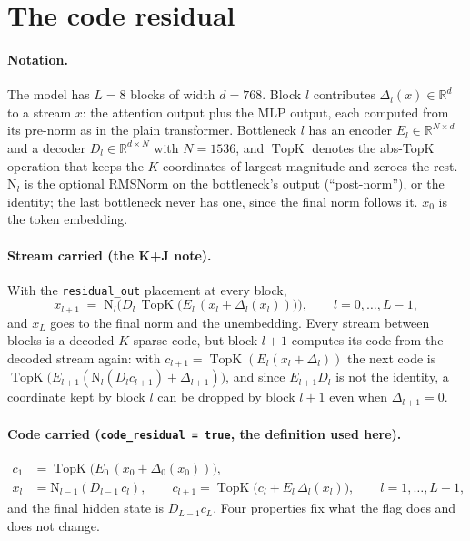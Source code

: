 \documentclass[11pt,a4paper]{article}
\newcommand{\code}[1]{\texttt{#1}}
\newcommand{\TopK}{\operatorname{TopK}}
\begin{document}
\section{The code residual}

\paragraph{Notation.}
The model has $L = 8$ blocks of width $d = 768$. Block $l$ contributes
$\Delta_l(x) \in \mathbb{R}^d$ to a stream $x$: the attention output plus the
MLP output, each computed from its pre-norm as in the plain transformer.
Bottleneck $l$ has an encoder $E_l \in \mathbb{R}^{N \times d}$ and a decoder
$D_l \in \mathbb{R}^{d \times N}$ with $N = 1536$, and $\TopK$ denotes the
abs-TopK operation that keeps the $K$ coordinates of largest magnitude and
zeroes the rest. $\mathrm{N}_l$ is the optional RMSNorm on the bottleneck's
output (``post-norm''), or the identity; the last bottleneck never has one,
since the final norm follows it. $x_0$ is the token embedding.

\paragraph{Stream carried (the K+J note).}
With the \code{residual\_out} placement at every block,
\begin{equation}
x_{l+1} \;=\; \mathrm{N}_l\!\Big(D_l \,\TopK\big(E_l\,(x_l + \Delta_l(x_l))\big)\Big),
\qquad l = 0, \dots, L-1,
\label{eq:stream}
\end{equation}
and $x_L$ goes to the final norm and the unembedding. Every stream between
blocks is a decoded $K$-sparse code, but block $l+1$ computes its code from
the decoded stream again: with $c_{l+1} = \TopK(E_l(x_l + \Delta_l))$ the
next code is $\TopK\big(E_{l+1}(\mathrm{N}_l(D_l c_{l+1}) + \Delta_{l+1})\big)$,
and since $E_{l+1} D_l$ is not the identity, a coordinate kept by block $l$
can be dropped by block $l+1$ even when $\Delta_{l+1} = 0$.

\paragraph{Code carried (\code{code\_residual = true}, the definition used here).}
\begin{align}
c_1 &= \TopK\big(E_0\,(x_0 + \Delta_0(x_0))\big), \label{eq:cr0}\\
x_l &= \mathrm{N}_{l-1}(D_{l-1}\, c_l), \qquad
c_{l+1} = \TopK\big(c_l + E_l\,\Delta_l(x_l)\big), \qquad l = 1, \dots, L-1,
\label{eq:cr}
\end{align}
and the final hidden state is $D_{L-1} c_L$. Four properties fix what the
flag does and does not change.
\end{document}

